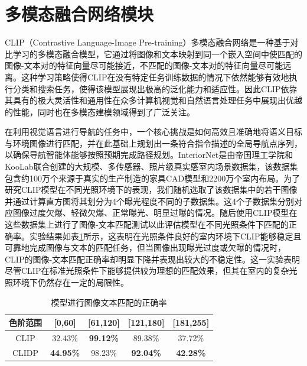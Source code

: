 \section{多模态融合网络模块}
CLIP（Contrastive Language-Image Pre-training）多模态融合网络\cite{radford2021learning}是一种基于对比学习的多模态融合模型，它通过将图像和文本映射到同一个嵌入空间中使匹配的图像-文本对的特征向量尽可能接近，不匹配的图像-文本对的特征向量尽可能远离。这种学习策略使得CLIP在没有特定任务训练数据的情况下依然能够有效地执行分类和搜索任务，使得该模型展现出极高的泛化能力和适应性。因此CLIP依靠其具有的极大灵活性和通用性在众多计算机视觉和自然语言处理任务中展现出优越的性能，同时也在多模态建模领域得到了广泛关注。

在利用视觉语言进行导航的任务中，一个核心挑战是如何高效且准确地将语义目标与环境图像进行匹配，并在此基础上规划出一条符合指令描述的全局导航点序列，以确保导航智能体能够按照预期完成路径规划。InteriorNet\cite{li2018interiornet}是由帝国理工学院和KooLab联合创建的大规模、多传感器、照片级真实感室内场景数据集，该数据集包含约100万个来源于真实的生产制造的家具CAD模型和2200万个室内布局。为了研究CLIP模型在不同光照环境下的表现，我们随机选取了该数据集中的若干图像并通过计算直方图将其划分为4个曝光程度不同的子数据集。这4个子数据集分别对应图像过度欠爆、轻微欠爆、正常曝光、明显过曝的情况。随后使用CLIP模型在这些数据集上进行了图像-文本匹配测试以此评估模型在不同光照条件下匹配的正确率。实验结果如表\ref{Matching_accuracy}所示，这表明在光照条件良好的室内环境下CLIP能够稳定且可靠地完成图像与文本的匹配任务，但当图像出现曝光过度或欠曝的情况时，CLIP的图像-文本匹配正确率却明显下降并表现出较大的不稳定性。这一实验表明尽管CLIP在标准光照条件下能够提供较为理想的匹配效果，但其在室内的复杂光照环境下仍然存在一定的局限性。

\begin{table}[ht]
	\centering
	\caption{模型进行图像文本匹配的正确率} %
	\begin{tabular}{ccccc} %
	\toprule %
	色阶范围 & [0,60] & [61,120] & [121,180] & [181,255]  \\ %
	\midrule %
	CLIP & 32.43\% & \textbf{99.12\%} & 89.38\% & 37.72\% \\ %
	CLIDP & \textbf{44.95\%} & 98.23\% & \textbf{92.04\%} & \textbf{42.28\%} \\ %
	\bottomrule %
	\end{tabular}
	\label{Matching_accuracy}
\end{table}

